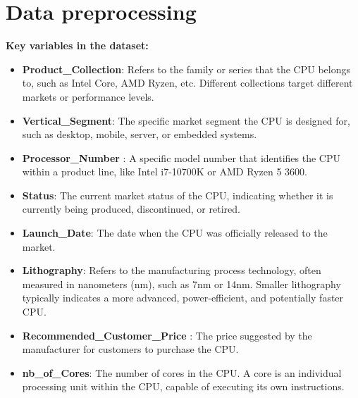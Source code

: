 \documentclass{article}
\begin{document}
	\section{Data preprocessing}
	\textbf{Key variables in the dataset:}
	\begin{itemize}
		\item \textbf{Product\_Collection}: Refers to the family or series that the CPU belongs to, such as Intel Core, AMD Ryzen, etc. Different collections target different markets or performance levels.
		\item \textbf{Vertical\_Segment}: The specific market segment the CPU is designed for, such as desktop, mobile, server, or embedded systems.
		\item \textbf{Processor\_Number
		}: A specific model number that identifies the CPU within a product line, like Intel i7-10700K or AMD Ryzen 5 3600.
		
		\item \textbf{Status}: The current market status of the CPU, indicating whether it is currently being produced, discontinued, or retired.
		\item \textbf{Launch\_Date}: The date when the CPU was officially released to the market.
		\item \textbf{Lithography}: Refers to the manufacturing process technology, often measured in nanometers (nm), such as 7nm or 14nm. Smaller lithography typically indicates a more advanced, power-efficient, and potentially faster CPU.
		\item \textbf{Recommended\_Customer\_Price
		}: The price suggested by the manufacturer for customers to purchase the CPU.
		
		\item \textbf{nb\_of\_Cores}: The number of cores in the CPU. A core is an individual processing unit within the CPU, capable of executing its own instructions.
		

\end{itemize}
\end{document}
